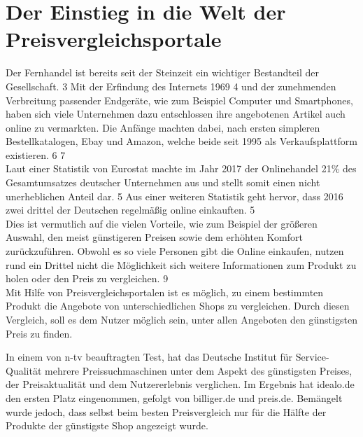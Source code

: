 \section{Der Einstieg in die Welt der Preisvergleichsportale}
\label{sec:einleitung-1}


Der Fernhandel ist bereits seit der Steinzeit ein wichtiger Bestandteil der Gesellschaft. 3
Mit der Erfindung des Internets 1969 4 und der zunehmenden Verbreitung passender Endgeräte, wie zum Beispiel Computer
und Smartphones, haben sich viele Unternehmen dazu entschlossen ihre angebotenen Artikel auch online zu vermarkten.
Die Anfänge machten dabei, nach ersten simpleren Bestellkatalogen, Ebay und Amazon, welche beide seit 1995 als
Verkaufsplattform existieren. 6 7\\
Laut einer Statistik von Eurostat machte im Jahr 2017 der Onlinehandel 21\% des Gesamtumsatzes deutscher Unternehmen
aus und stellt somit einen nicht unerheblichen Anteil dar. 5
Aus einer weiteren Statistik geht hervor, dass 2016 zwei drittel der Deutschen regelmäßig online einkauften. 5\\
Dies ist vermutlich auf die vielen Vorteile, wie zum Beispiel der größeren Auswahl, den meist günstigeren Preisen
sowie dem erhöhten Komfort zurückzuführen.
Obwohl es so viele Personen gibt die Online einkaufen, nutzen rund ein Drittel nicht die Möglichkeit sich weitere
Informationen zum Produkt zu holen oder den Preis zu vergleichen. 9\\
Mit Hilfe von Preisvergleichsportalen ist es möglich, zu einem bestimmten Produkt die Angebote von unterschiedlichen
Shops zu vergleichen.
Durch diesen Vergleich, soll es dem Nutzer möglich sein, unter allen Angeboten den günstigsten
Preis zu finden.

In einem von n-tv beauftragten Test, hat das Deutsche Institut für Service-Qualität mehrere Preissuchmaschinen unter
dem Aspekt des günstigsten Preises, der Preisaktualität und dem Nutzererlebnis verglichen.
Im Ergebnis hat idealo.de
den ersten Platz eingenommen, gefolgt von billiger.de und preis.de.
Bemängelt wurde jedoch, dass selbst beim besten Preisvergleich nur für die Hälfte der Produkte der günstigste Shop
angezeigt wurde.

